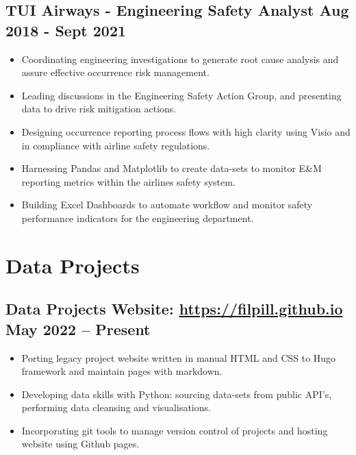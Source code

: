 \documentclass[a4paper,9pt]{article}
\begin{document}
\subsection*{\textbf{TUI Airways - Engineering Safety Analyst} \hfill  Aug 2018 - Sept 2021}
\begin{itemize}[noitemsep]
	\item Coordinating engineering investigations to generate root cause analysis and assure effective occurrence risk management.
	\item Leading discussions in the Engineering Safety Action Group, and presenting data to drive risk mitigation actions.
	\item Designing occurrence reporting process flows with high clarity using Visio and in compliance with airline safety regulations.
	\item Harnessing Pandas and Matplotlib to create data-sets to monitor E\&M reporting metrics within the airlines safety system.
	\item Building Excel Dashboards to automate workflow and monitor safety performance indicators for the engineering department.
\end{itemize}

%
%


\section*{Data Projects}

\subsection*{\textbf{Data Projects Website}: \url{https://filpill.github.io} \hfill  May 2022 – Present}
\begin{itemize}[noitemsep]

	\item  Porting legacy project website written in manual HTML and CSS to Hugo framework and maintain pages with markdown.
	\item  Developing data skills with Python: sourcing data-sets from public API's, performing data cleansing and visualisations.
	\item  Incorporating git tools to manage version control of projects and hosting website using Github pages.

\end{itemize}
\end{document}
